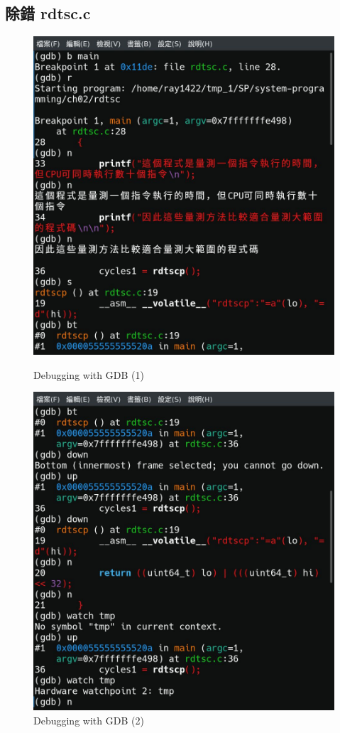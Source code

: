 \documentclass{ctexart}
\begin{document}
\subsection{除錯 rdtsc.c}
\begin{figure}[htbp]
\centering
\begin{minipage}[t]{0.49\textwidth}
\centering
\includegraphics[width=1\linewidth]{p1.jpg}
\caption{Debugging with GDB (1)}
\label{fig:gdb_1}
\end{minipage}
\begin{minipage}[t]{0.49\textwidth}
\centering
\includegraphics[width=1\linewidth]{p2.jpg}
\caption{Debugging with GDB (2)}
\label{fig:gdb_3}
\end{minipage}
\end{figure}
\end{document}
